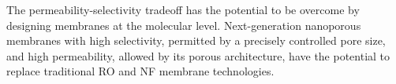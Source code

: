 \documentclass{article}
\begin{document}



  The permeability-selectivity tradeoff has the potential to be overcome by
  designing membranes at the molecular level. Next-generation nanoporous
  membranes with high selectivity, permitted by a precisely controlled pore size,
  and high permeability, allowed by its porous architecture, have the potential to
  replace traditional RO and NF membrane technologies. 
\end{document}
